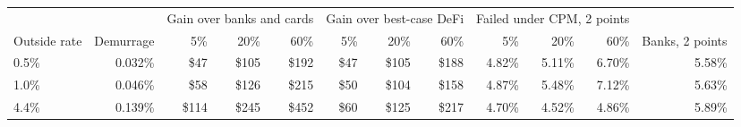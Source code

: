 \begin{tabular}{lrrrrrrrrrrr}
\toprule
 & & \multicolumn{3}{c}{Gain over banks and cards} & \multicolumn{3}{c}{Gain over best-case DeFi} & \multicolumn{3}{c}{Failed under CPM, 2 points} & \\
Outside rate & Demurrage & 5\% & 20\% & 60\% & 5\% & 20\% & 60\% & 5\% & 20\% & 60\% & Banks, 2 points \\
\midrule
0.5\% & 0.032\% & \$47 & \$105 & \$192 & \$47 & \$105 & \$188 & 4.82\% & 5.11\% & 6.70\% & 5.58\% \\
1.0\% & 0.046\% & \$58 & \$126 & \$215 & \$50 & \$104 & \$158 & 4.87\% & 5.48\% & 7.12\% & 5.63\% \\
\midrule
4.4\% & 0.139\% & \$114 & \$245 & \$452 & \$60 & \$125 & \$217 & 4.70\% & 4.52\% & 4.86\% & 5.89\% \\
\bottomrule
\end{tabular}
